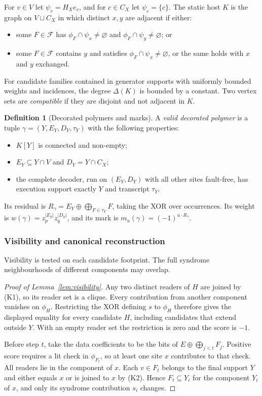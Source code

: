 \documentclass[10pt,twocolumn]{article}
\theoremstyle{definition}
\newtheorem{definition}{Definition}
\newcommand{\FF}{\mathcal{F}}
\begin{document}
For $v\in V$ let $\psi_v=H_Xe_v$, and for $c\in C_X$ let $\psi_c=\{c\}$. The static host $K$ is the graph on $V\sqcup C_X$ in which distinct $x,y$ are adjacent if either:
\begin{itemize}
\item[(K1)] some $F\in\FF$ has $\phi_F\cap\psi_x\neq\varnothing$ and $\phi_F\cap\psi_y\neq\varnothing$; or
\item[(K2)] some $F\in\FF$ contains $y$ and satisfies $\phi_F\cap\psi_x\neq\varnothing$, or the same holds with $x$ and $y$ exchanged.
\end{itemize}
For candidate families contained in generator supports with uniformly bounded weights and incidences, the degree $\Delta(K)$ is bounded by a constant. Two vertex sets are \emph{compatible} if they are disjoint and not adjacent in $K$.

\begin{definition}[Decorated polymers and marks]\label{def:polymer}
A \emph{valid decorated polymer} is a tuple $\gamma=(Y,E_Y,D_Y,\tau_Y)$ with the following properties:
\begin{itemize}
\item $K[Y]$ is connected and non-empty;
\item $E_Y\subseteq Y\cap V$ and $D_Y=Y\cap C_X$;
\item the complete decoder, run on $(E_Y,D_Y)$ with all other sites fault-free, has execution support exactly $Y$ and transcript $\tau_Y$.
\end{itemize}
Its residual is $R_\gamma=E_Y\oplus\bigoplus_{F\in\tau_Y}F$, taking the XOR over occurrences. Its weight is $w(\gamma)=z_p^{|E_Y|}z_q^{|D_Y|}$, and its mark is $m_u(\gamma)=(-1)^{u\cdot R_\gamma}$.
\end{definition}

\subsubsection{Visibility and canonical reconstruction}
Visibility is tested on each candidate footprint. The full syndrome
neighbourhoods of different components may overlap.

\begin{proof}[Proof of Lemma~\ref{lem:visibility}]
Any two distinct readers of $H$ are joined by (K1), so its reader set is a
clique. Every contribution from another component vanishes on $\phi_H$.
Restricting the XOR defining $s$ to $\phi_H$ therefore gives the
displayed equality for every candidate $H$, including candidates that
extend outside $Y$. With an empty reader set the restriction is zero
and the score is $-1$.

Before step $t$, take the data coefficients to be the bits of
$E\oplus\bigoplus_{j<t}F_j$. Positive score requires a lit check in
$\phi_{F_t}$, so at least one site $x$ contributes to that check. All
readers lie in the component of $x$. Each $v\in F_t$ belongs to the
final support $Y$ and either equals $x$ or is joined to $x$ by (K2).
Hence $F_t\subseteq Y_i$ for the component $Y_i$ of $x$, and only
its syndrome contribution $s_i$ changes.
\end{proof}
\end{document}
